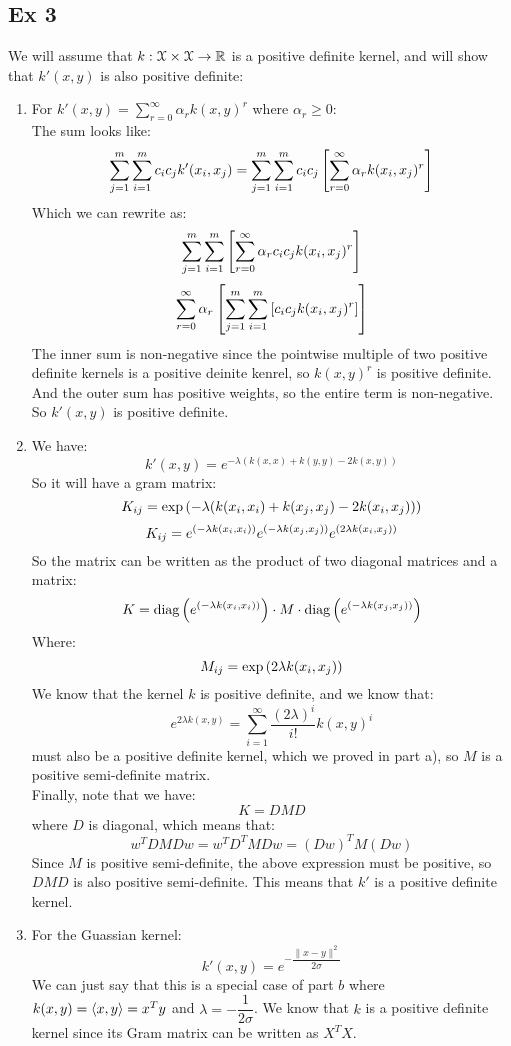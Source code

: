 \documentclass[12pt]{article}
\begin{document}
\newpage

\subsection*{Ex 3}
We will assume that $k: \mathcal{X} \times \mathcal{X} \to \mathbb{R}$
is a positive definite kernel, and
will show that $k'(x, y)$ is also positive definite:
\begin{enumerate}[label = \letters]
    \item 
    For $k'(x, y) = \sum_{r=0}^\infty
    \alpha_r k(x, y)^r$ where $\alpha_r \geq 0$: \\
    The sum looks like:
    \[ \sum_{j = 1}^m\sum_{i=1}^m c_ic_j k'(x_i, x_j)
    = \sum_{j = 1}^m\sum_{i=1}^m c_ic_j 
    \left[ \sum_{r=0}^\infty \alpha_r k(x_i, x_j)^r \right] \]
    Which we can rewrite as:
    \[ \sum_{j = 1}^m\sum_{i=1}^m
    \left[ \sum_{r=0}^\infty \alpha_r c_ic_j k(x_i, x_j)^r \right] \]
    \[ \sum_{r=0}^\infty \alpha_r \left[ 
     \sum_{j = 1}^m\sum_{i=1}^m
    \left[  c_ic_j k(x_i, x_j)^r \right] \right] \]
    The inner sum is non-negative since the pointwise
    multiple of two positive definite kernels is
    a positive deinite kenrel, so
    $k(x, y)^r$ is positive definite. And
    the outer sum has positive weights, 
    so the entire term is non-negative.
    So $k'(x, y)$ is positive definite. \\
    \item 
    We have:
    \[ k'(x, y) =  e^{-\lambda(k(x, x) + k(y, y) 
    - 2k(x, y))} \]
    So it will have a gram matrix:
    \[ K_{ij} = \exp\left( -\lambda(k(x_i, x_i) 
    + k(x_j, x_j) - 2k(x_i, x_j)) \right) \]
    \[ K_{ij} = e^{\left( -\lambda k(x_i, x_i) \right)}
    e^{\left( -\lambda k(x_j, x_j) \right)}
    e^{\left( 2\lambda k(x_i, x_j) \right)} \]
    So the matrix can be written
    as the product of two diagonal matrices
    and a matrix:
    \[ K = \text{diag}\left( e^{\left( -\lambda k(x_i, x_i) \right)} \right) 
    \cdot M \cdot
    \text{diag}\left( e^{\left( -\lambda k(x_j, x_j) \right)} \right) \]
    Where:
    \[ M_{ij} = \exp\left( 2\lambda k(x_i, x_j) \right) \]
    We know that the kernel $k$ is positive
    definite, and we know that:
    \[ e^{2\lambda k(x, y)}
    = \sum_{i=1}^{\infty} \dfrac{(2\lambda)^i}{i!}k(x, y)^i \]
    must also be a positive definite kernel,
    which we proved in part a),
    so $M$ is a positive semi-definite matrix. \\
    Finally, note that we have:
    \[ K = DMD \]
    where $D$ is diagonal, which means that:
    \[ w^TDMDw = w^TD^TMDw = (Dw)^TM(Dw)  \]
    Since $M$ is positive semi-definite, the
    above expression must be positive, so
    $DMD$ is also positive semi-definite. 
    This means that $k'$ is a positive definite 
    kernel. \\
    \item 
    For the Guassian kernel:
    \[ k'(x, y) = e^{-\dfrac{\|x - y\|^2}{2\sigma}} \]
    We can just say that this is a special case
    of part $b$ where $k(x, y) = \left\langle x, y \right\rangle = x^Ty$
    and $\lambda = -\dfrac{1}{2\sigma}$.
    We know that $k$ is a positive definite
    kernel since its Gram matrix can be written
    as $X^TX$. \\
\end{enumerate}
\end{document}
